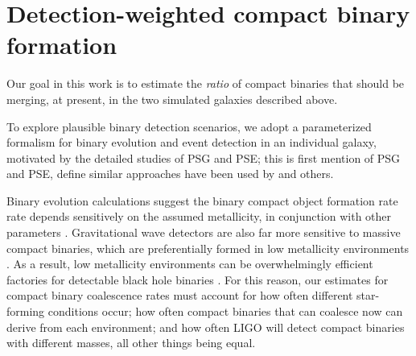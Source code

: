 \documentclass[nofootinbib,twocolumn,prd]{emulateapj}
\newcommand\jillianremark[1]{{\color{blue}#1}}
\newcommand\abbrvPSgrb{PSG}
\newcommand\abbrvPSellipticals{PSE}
\begin{document}
\section{Detection-weighted compact binary formation}
\label{sec:model}

Our goal in this work is to estimate the \emph{ratio} of compact binaries that should be merging, at present, in the two
simulated galaxies described above.

To explore plausible binary detection scenarios, we adopt a parameterized formalism for binary evolution and event
detection in an individual galaxy, motivated by
the detailed studies of  \abbrvPSgrb{} and \abbrvPSellipticals; \jillianremark{this is first mention of PSG and PSE, define} similar approaches have been used by
\cite{2016arXiv160508783L} and others.


Binary evolution calculations suggest the binary compact object formation rate rate depends sensitively on the assumed metallicity, in conjunction
with other parameters \citep[see,\,e.g.][and references
  therein]{popsyn-LowMetallicityImpact-Chris2008,popsyn-LIGO-SFR-2008,gwastro-EventPopsynPaper-2016}.
Gravitational wave detectors are also far more sensitive to  massive compact binaries, which are  preferentially  formed in low metallicity
environments \citep{PSellipticals,popsyn-LowMetallicityImpact2c-StarTrackRevised-2014}.  As a result, low metallicity
environments can be overwhelmingly efficient factories for detectable black hole binaries
\citep{popsyn-LowMetallicityImpact2c-StarTrackRevised-2014,gwastro-EventPopsynPaper-2016}.  
%
For this reason, our estimates for compact binary coalescence rates must account for how often  different star-forming
conditions occur;  how often compact binaries that can coalesce now can derive from each environment; and how often LIGO will detect compact
binaries with different masses, all other things being equal.
\end{document}
